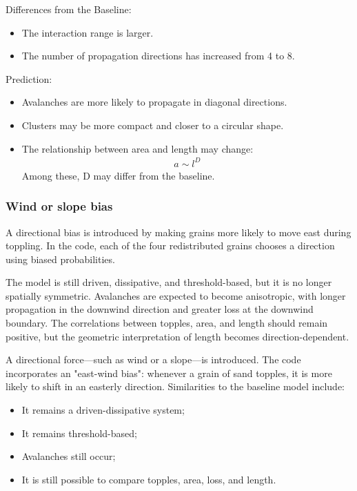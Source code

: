 \documentclass{article}
\begin{document}
\clearpage

Differences from the Baseline:
\begin{itemize}
    \item The interaction range is larger.
    \item The number of propagation directions has increased from 4 to 8.
\end{itemize}

Prediction:
\begin{itemize}
    \item Avalanches are more likely to propagate in diagonal directions.
    \item Clusters may be more compact and closer to a circular shape.
    \item The relationship between area and length may change:
    \begin{align}
        a \sim l^D
    \end{align}
    Among these, D may differ from the baseline.
\end{itemize}

\subsubsection{Wind or slope bias}

A directional bias is introduced by making grains more likely to move east during toppling. In the code, each of the four redistributed grains chooses a direction using biased probabilities.

The model is still driven, dissipative, and threshold-based, but it is no longer spatially symmetric. Avalanches are expected to become anisotropic, with longer propagation in the downwind direction and greater loss at the downwind boundary. The correlations between topples, area, and length should remain positive, but the geometric interpretation of length becomes direction-dependent.

A directional force—such as wind or a slope—is introduced. The code incorporates an "east-wind bias": whenever a grain of sand topples, it is more likely to shift in an easterly direction. Similarities to the baseline model include:
\begin{itemize}
    \item It remains a driven-dissipative system;
    \item It remains threshold-based;
    \item Avalanches still occur;
    \item It is still possible to compare topples, area, loss, and length.
\end{itemize}
\end{document}
